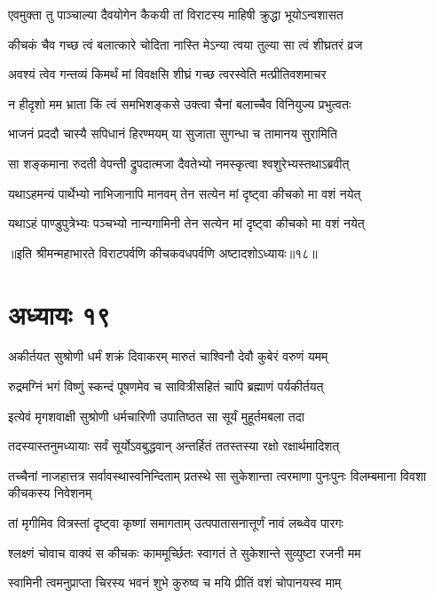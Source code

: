 \twolineshloka
{एवमुक्ता तु पाञ्चाल्या दैवयोगेन कैकयी}
{तां विराटस्य माहिषी क्रुद्धा भूयोऽन्वशासत}


\twolineshloka
{कीचकं चैव गच्छ त्वं बलात्कारे चोदिता}
{नास्ति मेऽन्या त्वया तुल्या सा त्वं शीघ्रतरं व्रज}


\twolineshloka
{अवश्यं त्वेव गन्तव्यं किमर्थं मां विवक्षसि}
{शीघ्रं गच्छ त्वरस्वेति मत्प्रीतिवशमाचर}


\twolineshloka
{न हीदृशो मम भ्राता किं त्वं समभिशङ्कसे}
{उक्त्वा चैनां बलाच्चैव विनियुज्य प्रभुत्वतः}


\twolineshloka
{भाजनं प्रददौ चास्यै सपिधानं हिरण्मयम्}
{या सुजाता सुगन्धा च तामानय सुरामिति}


\twolineshloka
{सा शङ्कमाना रुदती वेपन्ती द्रुपदात्मजा}
{दैवतेभ्यो नमस्कृत्वा श्वशुरेभ्यस्तथाऽब्रवीत्}


\twolineshloka
{यथाऽहमन्यं पार्थेभ्यो नाभिजानापि मानवम्}
{तेन सत्येन मां दृष्ट्वा कीचको मा वशं नयेत्}


\twolineshloka
{यथाऽहं पाण्डुपुत्रेभ्यः पञ्चभ्यो नान्यगामिनी}
{तेन सत्येन मां दृष्ट्वा कीचको मा वशं नयेत्}

॥इति श्रीमन्महाभारते विराटपर्वणि कीचकवधपर्वणि अष्टादशोऽध्यायः॥१८॥

\chapter{अध्यायः १९}

\twolineshloka
{अकीर्तयत सुश्रोणी धर्मं शक्रं दिवाकरम्}
{मारुतं चाश्विनौ देवौ कुबेरं वरुणं यमम्}


\twolineshloka
{रुद्रमग्निं भगं विष्णुं स्कन्दं पूषणमेव च}
{सावित्रीसहितं चापि ब्रह्माणं पर्यकीर्तयत्}


\twolineshloka
{इत्येवं मृगशवाक्षी सुश्रोणी धर्मचारिणी}
{उपातिष्ठत सा सूर्यं मुहूर्तमबला तदा}


\twolineshloka
{तदस्यास्तनुमध्यायाः सर्वं सूर्योऽवबुद्धवान्}
{अन्तर्हितं ततस्तस्या रक्षो रक्षार्थमादिशत्}


\onelineshloka
{तच्चैनां नाजहात्तत्र सर्वावस्थास्वनिन्दिताम्}
\twolineshloka
{प्रतस्थे सा सुकेशान्ता त्वरमाणा पुनःपुनः}
{विलम्बमाना विवशा कीचकस्य निवेशनम्}


\twolineshloka
{तां मृगीमिव वित्रस्तां दृष्ट्वा कृष्णां समागताम्}
{उत्पपातासनात्तूर्णं नावं लब्ध्वेव पारगः}


\twolineshloka
{श्लक्ष्णं चोवाच वाक्यं स कीचकः काममूर्च्छितः}
{स्वागतं ते सुकेशान्ते सुव्युष्टा रजनी मम}


\twolineshloka
{स्वामिनी त्वमनुप्राप्ता चिरस्य भवनं शुभे}
{कुरुष्व च मयि प्रीतिं वशं चोपानयस्व माम्}


